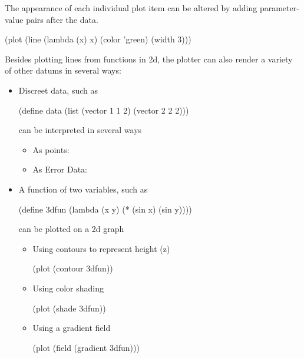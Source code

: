 \documentclass{article}
\begin{document}
{\begin{schemedisplay}
\end{schemedisplay}


The appearance of each individual plot item can be altered by adding parameter-value pairs after the
data.
\begin{schemedisplay}
(plot 
 (line 
  (lambda (x) x) 
  (color 'green) (width 3)))
\end{schemedisplay}

Besides plotting lines from functions in 2d, the plotter
      can also render a variety of other datums
      in several ways:
\begin{itemize}
\item 
  Discreet data, such as
  \begin{schemedisplay}
    
(define data 
 (list 
  (vector 1 1 2) 
  (vector 2 2 2)))
\end{schemedisplay}
can be interpreted in several ways\begin{itemize}
\item As points: 
\end{itemize}
\begin{itemize}
\item As Error Data: 
\end{itemize}
\begin{itemize}
\end{itemize}


\item 
  A function of two variables, such as
\begin{schemedisplay}
(define 3dfun (lambda (x y) (* (sin x) (sin y))))
\end{schemedisplay}
can be plotted on a 2d graph
\begin{itemize}
\item Using contours to represent height (z)
 \begin{schemedisplay}
(plot (contour 3dfun))
\end{schemedisplay}

\item Using color shading
\begin{schemedisplay}
(plot (shade 3dfun))
\end{schemedisplay}

\item Using a gradient field
\begin{schemedisplay}
(plot (field (gradient 3dfun)))
\end{schemedisplay}


\end{itemize}
\end{itemize}}
\end{document}
